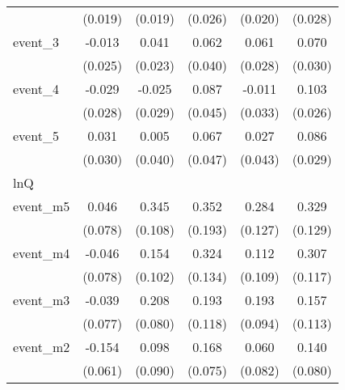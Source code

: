 {\begin{tabular}{l*{5}{c}}
            &     (0.019)         &     (0.019)         &     (0.026)         &     (0.020)         &     (0.028)         \\
[1em]
event\_3     &      -0.013         &       0.041         &       0.062         &       0.061\sym{*}  &       0.070\sym{*}  \\
            &     (0.025)         &     (0.023)         &     (0.040)         &     (0.028)         &     (0.030)         \\
[1em]
event\_4     &      -0.029         &      -0.025         &       0.087         &      -0.011         &       0.103\sym{***}\\
            &     (0.028)         &     (0.029)         &     (0.045)         &     (0.033)         &     (0.026)         \\
[1em]
event\_5     &       0.031         &       0.005         &       0.067         &       0.027         &       0.086\sym{**} \\
            &     (0.030)         &     (0.040)         &     (0.047)         &     (0.043)         &     (0.029)         \\
\hline
lnQ         &                     &                     &                     &                     &                     \\
event\_m5    &       0.046         &       0.345\sym{**} &       0.352         &       0.284\sym{*}  &       0.329\sym{*}  \\
            &     (0.078)         &     (0.108)         &     (0.193)         &     (0.127)         &     (0.129)         \\
[1em]
event\_m4    &      -0.046         &       0.154         &       0.324\sym{*}  &       0.112         &       0.307\sym{**} \\
            &     (0.078)         &     (0.102)         &     (0.134)         &     (0.109)         &     (0.117)         \\
[1em]
event\_m3    &      -0.039         &       0.208\sym{**} &       0.193         &       0.193\sym{*}  &       0.157         \\
            &     (0.077)         &     (0.080)         &     (0.118)         &     (0.094)         &     (0.113)         \\
[1em]
event\_m2    &      -0.154\sym{*}  &       0.098         &       0.168\sym{*}  &       0.060         &       0.140         \\
            &     (0.061)         &     (0.090)         &     (0.075)         &     (0.082)         &     (0.080)         \\

\end{tabular}}
